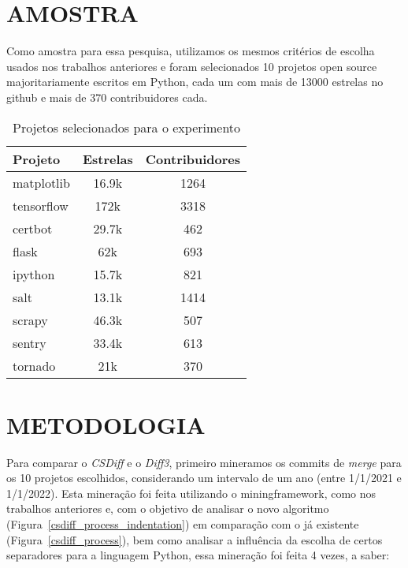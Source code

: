 \section{AMOSTRA}
Como amostra para essa pesquisa, utilizamos os mesmos critérios de escolha
usados nos trabalhos anteriores e foram selecionados 10 projetos open source majoritariamente escritos em Python,
cada um com mais de 13000 estrelas no github e mais de 370 contribuidores cada.

\begin{table}[ht]
	\begin{center}
		\begin{tabular}{|l|c|c|}
			\hline
			\textbf{Projeto} & \textbf{Estrelas} & \textbf{Contribuidores} \\
			\hline
			matplotlib       & 16.9k             & 1264                    \\
			tensorflow       & 172k              & 3318                    \\
			certbot          & 29.7k             & 462                     \\
			flask            & 62k               & 693                     \\
			ipython          & 15.7k             & 821                     \\
			salt             & 13.1k             & 1414                    \\
			scrapy           & 46.3k             & 507                     \\
			sentry           & 33.4k             & 613                     \\
			tornado          & 21k               & 370                     \\
			\hline
		\end{tabular}
	\end{center}
	\caption{Projetos selecionados para o experimento}\label{tabela_projeto}
\end{table}

\section{METODOLOGIA}\label{metodologia}
Para comparar o \emph{CSDiff} e o \emph{Diff3}, primeiro mineramos os commits de \emph{merge} para os 10 projetos escolhidos, considerando um
intervalo de um ano (entre 1/1/2021 e 1/1/2022). Esta mineração foi feita utilizando o miningframework, como nos trabalhos
anteriores e, com o objetivo de analisar o novo algoritmo (Figura~\ref{csdiff_process_indentation}) em comparação com o já
existente (Figura~\ref{csdiff_process}), bem como analisar a influência da escolha de certos separadores para a linguagem Python,
essa mineração foi feita 4 vezes, a saber:

